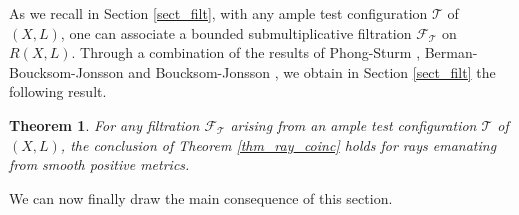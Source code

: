\documentclass[12pt]{article}
\numberwithin{equation}{section}
\theoremstyle{theorem}
\newtheorem{thm}{Theorem}[section]
\theoremstyle{definition}
\theoremstyle{remark}
\begin{document}
	\par 
	As we recall in Section \ref{sect_filt}, with any ample test configuration $\mathcal{T}$ of $(X, L)$, one can associate a bounded submultiplicative filtration $\mathcal{F}_{\mathcal{T}}$ on $R(X, L)$. 
	Through a combination of the results of Phong-Sturm \cite{PhongSturmRegul}, Berman-Boucksom-Jonsson \cite{BerBouckJonYTD} and Boucksom-Jonsson \cite{BouckJohn21}, we obtain in Section \ref{sect_filt} the following result.
	\begin{thm}\label{thm_ray_coinc_test}
		For any filtration $\mathcal{F}_{\mathcal{T}}$ arising from an ample test configuration $\mathcal{T}$ of $(X, L)$, the conclusion of Theorem \ref{thm_ray_coinc} holds for rays emanating from smooth positive metrics.
	\end{thm}
	We can now finally draw the main consequence of this section.
\end{document}
